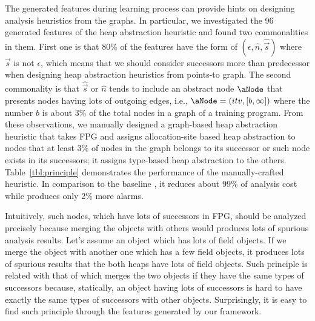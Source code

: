 The generated features during learning process can provide hints on designing analysis heuristics from the graphs. 
In particular, we investigated the 96 generated features of the heap abstraction
heuristic and found two commonalities in them.
First one is that 80\% of the features have the form of $(\epsilon,\hat{n}, \hat{\vec{s}})$ where $\vec{s}$ is not $\epsilon$,
which means that we should consider successors more than predecessor when designing heap abstraction heuristics from points-to graph.
The second commonality is that $\hat{\vec{s}}$ or $\hat{n}$ tends to include an abstract
node $\aNode$ that presents nodes having lots of outgoing edges, i.e., $\aNode =
(itv,[b,\infty])$ where the number $b$ is about $3\%$ of the total nodes in a graph of a training program. 
From these observations, we manually designed a graph-based heap abstraction heuristic that
takes FPG and assigns allocation-site based heap abstraction to nodes 
that at least $3\%$ of nodes in the graph belongs to its successor
or such node exists in its successors; it assigns type-based heap abstraction to the others.
Table~\ref{tbl:principle} demonstrates the performance of the manually-crafted heuristic.
In comparison to the baseline \AllocBased, it reduces about 99\% of analysis cost while produces only 2\% more alarms.



Intuitively, such nodes, which have lots of successors in FPG, should
be analyzed precisely because merging the objects with others would produces lots of spurious analysis results. 
Let's assume an object which has lots of field objects. 
If we merge the object with another one which has a few field objects, it produces lots of spurious 
results that the both heaps have lots of field objects.
Such principle is related with that of \Mahjong which merges the two objects if they have the same types of successors because,
statically, an object having lots of successors is hard to have exactly the same types of successors with other objects.
Surprisingly, it is easy to find such principle through the features generated by our framework.


